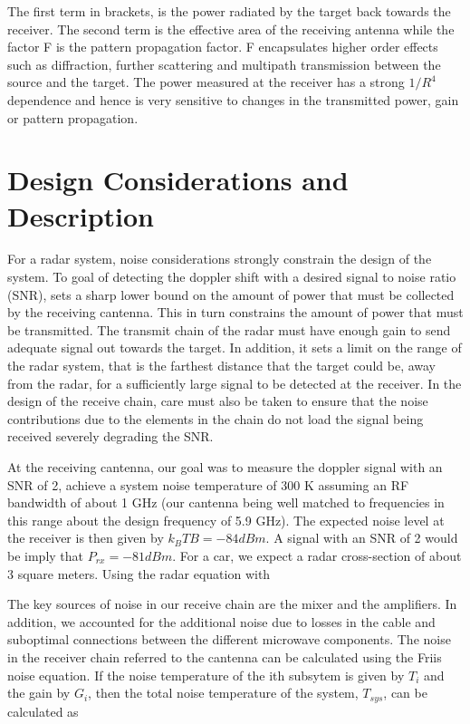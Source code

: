 \documentclass[reprint, aps, prl]{revtex4-1}
\begin{document}
The first term in brackets, is the power radiated by the target back towards the receiver. The second term is the effective area of the receiving antenna while the factor F is the pattern propagation factor. F encapsulates higher order effects such as diffraction, further scattering and multipath transmission between the source and the target. The power measured at the receiver has a strong $1/R^4$ dependence and hence is very sensitive to changes in the transmitted power, gain or pattern propagation.

\section{Design Considerations and Description}
For a radar system, noise considerations strongly constrain the design of the system. To goal of detecting the doppler shift with a desired signal to noise ratio (SNR), sets a sharp lower bound on the amount of power that must be collected by the receiving cantenna. This in turn constrains the amount of power that must be transmitted. The transmit chain of the radar must have enough gain to send adequate signal out towards the target. In addition, it sets a limit on the range of the radar system, that is the farthest distance that the target could be, away from the radar, for a sufficiently large signal to be detected at the receiver. In the design of the receive chain, care must also be taken to ensure that the noise contributions due to the elements in the chain do not load the signal being received severely degrading the SNR.

At the receiving cantenna, our goal was to measure the doppler signal with an SNR of 2, achieve a system noise temperature of 300 K assuming an RF bandwidth of about 1 GHz (our cantenna being well matched to frequencies in this range about the design frequency of 5.9 GHz). The expected noise level at the receiver is then given by $k_B T B = -84 dBm$. A signal with an SNR of 2 would be imply that $P_{rx} = -81 dBm$. For a car, we expect a radar cross-section of about 3 square meters. Using the radar equation with 

The key sources of noise in our receive chain are the mixer and the amplifiers. In addition, we accounted for the additional noise due to losses in the cable and suboptimal connections between the different microwave components. The noise in the receiver chain referred to the cantenna can be calculated using the Friis noise equation. If the noise temperature of the ith subsytem is given by $T_i$ and the gain by $G_i$, then the total noise temperature of the system, $T_{sys}$, can be calculated as
\end{document}
